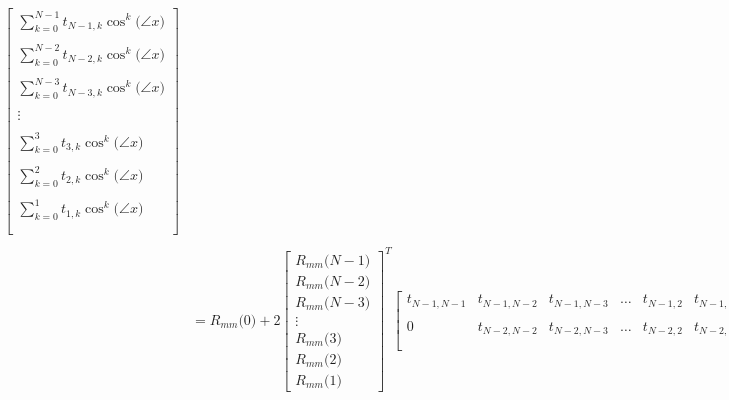 \documentclass{article}
\begin{document}
\begin{align*}
\begin{bmatrix}
                                \sum_{k=0}^{N - 1}t_{N - 1, k}\cos^{k}\big(\angle{x}\big) \\ \\
                                \sum_{k=0}^{N - 2}t_{N - 2, k}\cos^{k}\big(\angle{x}\big) \\ \\
                                \sum_{k=0}^{N - 3}t_{N - 3, k}\cos^{k}\big(\angle{x}\big) \\ \\
                                \vdots \\ \\
                                \sum_{k=0}^{3}t_{3, k}\cos^{k}\big(\angle{x}\big) \\ \\
                                \sum_{k=0}^{2}t_{2, k}\cos^{k}\big(\angle{x}\big) \\ \\
                                \sum_{k=0}^{1}t_{1, k}\cos^{k}\big(\angle{x}\big) \\ \\
                              \end{bmatrix} \\ \\
    &= R_{mm}\big(0\big) + 2\begin{bmatrix}
                                R_{mm}\big(N - 1\big) \\
                                R_{mm}\big(N - 2\big) \\
                                R_{mm}\big(N - 3\big) \\
                                \vdots \\
                                R_{mm}\big(3\big) \\
                                R_{mm}\big(2\big) \\
                                R_{mm}\big(1\big)
                              \end{bmatrix}^{T}
                            \begin{bmatrix}
                                t_{N - 1, N - 1} & t_{N - 1, N - 2} & t_{N - 1, N - 3} & \ldots & t_{N - 1, 2} & t_{N - 1, 1} & t_{N - 1, 0} \\ \\
                                               0 & t_{N - 2, N - 2} & t_{N - 2, N - 3} & \ldots & t_{N - 2, 2} & t_{N - 2, 1} & t_{N - 1, 0} \\ \\

\end{bmatrix}
\end{align*}
\end{document}
